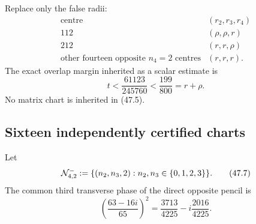 \documentclass[11pt,oneside]{article}
\theoremstyle{definition}
\theoremstyle{remark}
\begin{document}
Replace only the false radii:
\[
\begin{array}{c|c}
\text{centre}&(r_2,r_3,r_4)\\ \hline
112&(\rho,\rho,r)\\
212&(r,r,\rho)\\
\text{other fourteen opposite \(n_4=2\) centres}&(r,r,r).
\end{array}                                             \tag{47.5}
\]
The exact overlap margin inherited as a scalar estimate is
\[
 t<\frac{61123}{245760}
   <\frac{199}{800}=r+\rho.                            \tag{47.6}
\]
No matrix chart is inherited in (47.5).

\subsection{Sixteen independently certified charts}

Let
\[
 {\cal N}_{4,2}^{-}:=
 \{(n_2,n_3,2):n_2,n_3\in\{0,1,2,3\}\}.               \tag{47.7}
\]
The common third transverse phase of the direct opposite pencil is
\[
 \left(\frac{63-16i}{65}\right)^2
 =\frac{3713}{4225}-i\frac{2016}{4225}.                \tag{47.8}
\]
\end{document}
